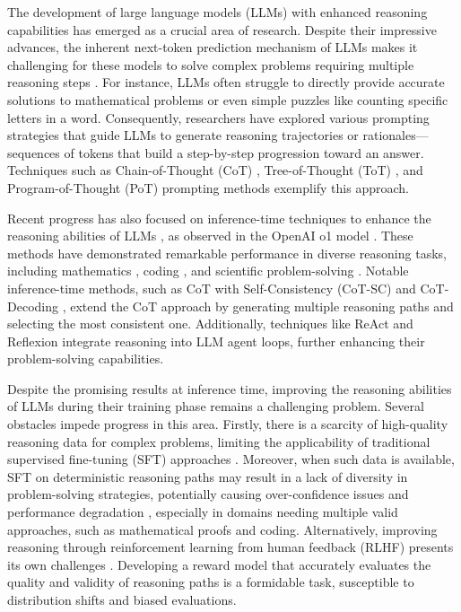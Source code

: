 The development of large language models (LLMs) with enhanced reasoning capabilities has emerged as a crucial area of research. Despite their impressive advances, the inherent next-token prediction mechanism of LLMs makes it challenging for these models to solve complex problems requiring multiple reasoning steps \citep{wang2022self, huang2023large}. For instance, LLMs often struggle to directly provide accurate solutions to mathematical problems or even simple puzzles like counting specific letters in a word.
Consequently, researchers have explored various prompting strategies that guide LLMs to generate reasoning trajectories or rationales—sequences of tokens that build a step-by-step progression toward an answer. Techniques such as Chain-of-Thought (CoT) \citep{DBLP:conf/nips/Wei0SBIXCLZ22}, Tree-of-Thought (ToT) \citep{yao2024tree}, and Program-of-Thought (PoT) \citep{DBLP:journals/tmlr/ChenM0C23} prompting methods exemplify this approach.



Recent progress has also focused on inference-time techniques to enhance the reasoning abilities of LLMs \citep{wu2024empirical, brown2024large}, as observed in the OpenAI o1 model \citep{openai_learning_2024}. These methods have demonstrated remarkable performance in diverse reasoning tasks, including mathematics \citep{cobbe2021training, trinh2024solving, luo2024improve}, coding \citep{jimenez2023swe, guo2024deepseek, zhang2024diversity}, and scientific problem-solving \citep{rein2023gpqa}. Notable inference-time methods, such as CoT with Self-Consistency (CoT-SC) \citep{DBLP:conf/iclr/0002WSLCNCZ23} and CoT-Decoding \citep{wang2024chain}, extend the CoT approach by generating multiple reasoning paths and selecting the most consistent one. Additionally, techniques like ReAct \citep{DBLP:conf/iclr/YaoZYDSN023} and Reflexion \citep{DBLP:conf/nips/ShinnCGNY23} integrate reasoning into LLM agent loops, further enhancing their problem-solving capabilities.

Despite the promising results at inference time, improving the reasoning abilities of LLMs during their training phase remains a challenging problem. Several obstacles impede progress in this area. Firstly, there is a scarcity of high-quality reasoning data for complex problems, limiting the applicability of traditional supervised fine-tuning (SFT) approaches \citep{zelikman2022star}. Moreover, when such data is available, SFT on deterministic reasoning paths may result in a lack of diversity in problem-solving strategies, potentially causing over-confidence issues and performance degradation \citep{cobbe2021training}, especially in domains needing multiple valid approaches, such as mathematical proofs and coding.
Alternatively, improving reasoning through reinforcement learning from human feedback (RLHF) presents its own challenges \citep{havrilla2024teaching,luo2024improve}. Developing a reward model that accurately evaluates the quality and validity of reasoning paths is a formidable task, susceptible to distribution shifts and biased evaluations. 

